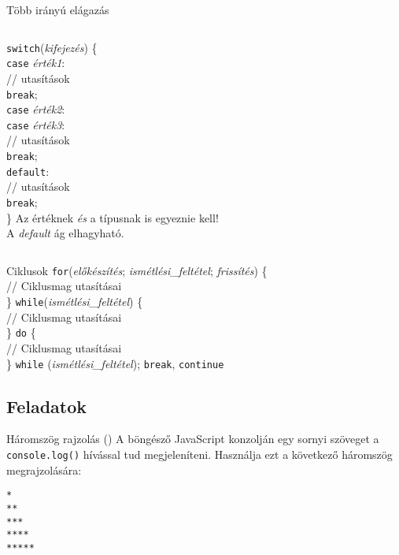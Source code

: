 \begin{frame}
    Több irányú elágazás
    \begin{columns}[T]
        \texttt{switch}(\emph{kifejezés}) \{ \\
        \qquad \texttt{case} \emph{érték1}: \\
        \qquad \qquad // utasítások \\
        \qquad \qquad \texttt{break}; \\
        \qquad \texttt{case} \emph{érték2}: \\
        \qquad \texttt{case} \emph{érték3}: \\
        \qquad \qquad // utasítások \\
        \qquad \qquad \texttt{break}; \\
        \qquad \texttt{default}: \\
        \qquad \qquad // utasítások \\
        \qquad \qquad \texttt{break}; \\
        \}
        Az értéknek \emph{és} a típusnak is egyeznie kell! \\
        A \emph{default} ág elhagyható.
    \end{columns}
\end{frame}

\begin{frame}
    Ciklusok
    \vfill
    \texttt{for}(\emph{előkészítés}; \emph{ismétlési\_feltétel}; \emph{frissítés}) \{ \\
    \qquad // Ciklusmag utasításai \\
    \}
    \vfill
    \texttt{while}(\emph{ismétlési\_feltétel}) \{ \\
    \qquad // Ciklusmag utasításai \\
    \}
    \vfill
    \texttt{do} \{ \\
    \qquad // Ciklusmag utasításai \\
    \} \texttt{while} (\emph{ismétlési\_feltétel});
    \vfill
    \texttt{break}, \texttt{continue}
\end{frame}

\subsection{Feladatok}

\begin{frame}[fragile]
    \begin{exampleblock}{Háromszög rajzolás ()}
        A böngésző JavaScript konzolján egy sornyi szöveget a \texttt{console.log()} hívással tud megjeleníteni. Használja ezt a következő háromszög megrajzolására:\\
        \begin{verbatim}
*
**
***
****
*****                
\end{verbatim}
    \end{exampleblock}
\end{frame}

